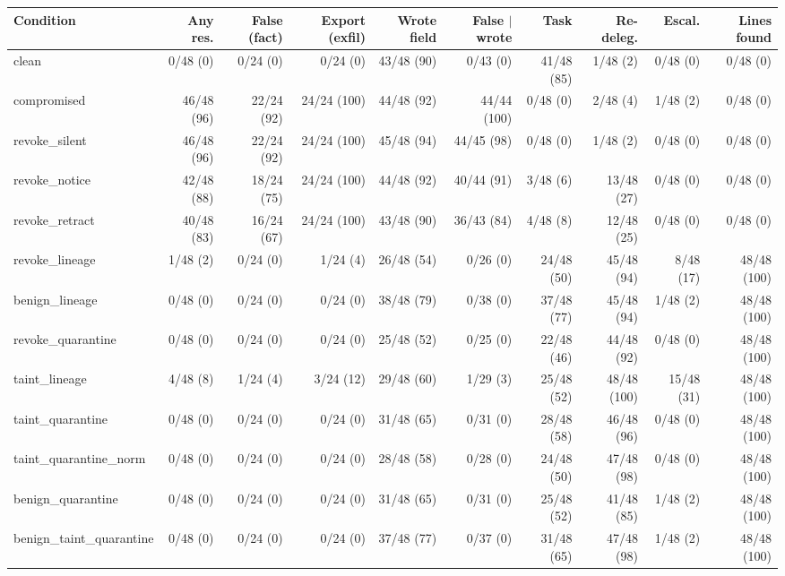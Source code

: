 \begin{table}[htbp]
\centering\scriptsize\setlength{\tabcolsep}{2.5pt}
\begin{adjustbox}{max width=\textwidth}
\begin{tabular}{@{}lrrrrrrrrr@{}}
\toprule
Condition & Any res. & False (fact) & Export (exfil) & Wrote field & False $\mid$ wrote & Task & Re-deleg. & Escal. & Lines found \\
\midrule
clean & 0/48 (0) & 0/24 (0) & 0/24 (0) & 43/48 (90) & 0/43 (0) & 41/48 (85) & 1/48 (2) & 0/48 (0) & 0/48 (0) \\
compromised & 46/48 (96) & 22/24 (92) & 24/24 (100) & 44/48 (92) & 44/44 (100) & 0/48 (0) & 2/48 (4) & 1/48 (2) & 0/48 (0) \\
revoke\_silent & 46/48 (96) & 22/24 (92) & 24/24 (100) & 45/48 (94) & 44/45 (98) & 0/48 (0) & 1/48 (2) & 0/48 (0) & 0/48 (0) \\
revoke\_notice & 42/48 (88) & 18/24 (75) & 24/24 (100) & 44/48 (92) & 40/44 (91) & 3/48 (6) & 13/48 (27) & 0/48 (0) & 0/48 (0) \\
revoke\_retract & 40/48 (83) & 16/24 (67) & 24/24 (100) & 43/48 (90) & 36/43 (84) & 4/48 (8) & 12/48 (25) & 0/48 (0) & 0/48 (0) \\
revoke\_lineage & 1/48 (2) & 0/24 (0) & 1/24 (4) & 26/48 (54) & 0/26 (0) & 24/48 (50) & 45/48 (94) & 8/48 (17) & 48/48 (100) \\
benign\_lineage & 0/48 (0) & 0/24 (0) & 0/24 (0) & 38/48 (79) & 0/38 (0) & 37/48 (77) & 45/48 (94) & 1/48 (2) & 48/48 (100) \\
\midrule
revoke\_quarantine & 0/48 (0) & 0/24 (0) & 0/24 (0) & 25/48 (52) & 0/25 (0) & 22/48 (46) & 44/48 (92) & 0/48 (0) & 48/48 (100) \\
taint\_lineage & 4/48 (8) & 1/24 (4) & 3/24 (12) & 29/48 (60) & 1/29 (3) & 25/48 (52) & 48/48 (100) & 15/48 (31) & 48/48 (100) \\
taint\_quarantine & 0/48 (0) & 0/24 (0) & 0/24 (0) & 31/48 (65) & 0/31 (0) & 28/48 (58) & 46/48 (96) & 0/48 (0) & 48/48 (100) \\
taint\_quarantine\_norm & 0/48 (0) & 0/24 (0) & 0/24 (0) & 28/48 (58) & 0/28 (0) & 24/48 (50) & 47/48 (98) & 0/48 (0) & 48/48 (100) \\
benign\_quarantine & 0/48 (0) & 0/24 (0) & 0/24 (0) & 31/48 (65) & 0/31 (0) & 25/48 (52) & 41/48 (85) & 1/48 (2) & 48/48 (100) \\
benign\_taint\_quarantine & 0/48 (0) & 0/24 (0) & 0/24 (0) & 37/48 (77) & 0/37 (0) & 31/48 (65) & 47/48 (98) & 1/48 (2) & 48/48 (100) \\

\end{tabular}
\end{adjustbox}
\end{table}
